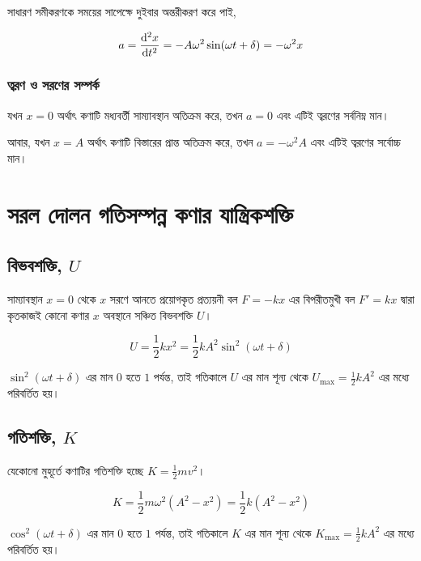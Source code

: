 সাধারণ সমীকরণকে সময়ের সাপেক্ষে দুইবার অন্তরীকরণ করে পাই,

\begin{equation}
    a = \dv[2]{x}{t} = -A\omega^2 \sin(\omega t + \delta) = -\omega^2 x
\end{equation}

\subsubsection{ত্বরণ ও সরণের সম্পর্ক}

যখন $x = 0$ অর্থাৎ কণাটি মধ্যবর্তী সাম্যাবস্থান অতিক্রম করে, তখন $a = 0$ এবং এটিই ত্বরণের সর্বনিম্ন মান।

আবার, যখন $x = A$ অর্থাৎ কণাটি বিস্তারের প্রান্ত অতিক্রম করে, তখন $a = -\omega^2 A$ এবং এটিই ত্বরণের সর্বোচ্চ মান।

\section{সরল দোলন গতিসম্পন্ন কণার যান্ত্রিকশক্তি}

\subsection{বিভবশক্তি, $U$}

সাম্যাবস্থান $x = 0$ থেকে $x$ সরণে আনতে প্রয়োগকৃত প্রত্যয়নী বল $F = -kx$ এর বিপরীতমুখী বল $F' = kx$ দ্বারা কৃতকাজই কোনো কণার $x$ অবস্থানে সঞ্চিত বিভবশক্তি $U$।

\begin{equation}
    U = \frac{1}{2}kx^2 = \frac{1}{2}k A^2 \sin^2(\omega t + \delta)
\end{equation}

$\sin^2(\omega t + \delta)$ এর মান $0$ হতে $1$ পর্যন্ত, তাই গতিকালে $U$ এর মান শূন্য থেকে $U_{\max} = \frac{1}{2}kA^2$ এর মধ্যে পরিবর্তিত হয়।

\subsection{গতিশক্তি, $K$}

যেকোনো মুহূর্তে কণাটির গতিশক্তি হচ্ছে $K = \frac{1}{2}mv^2$।

\begin{equation}
    K = \frac{1}{2}m\omega^2(A^2 - x^2) = \frac{1}{2}k(A^2 - x^2)
\end{equation}

$\cos^2(\omega t + \delta)$ এর মান $0$ হতে $1$ পর্যন্ত, তাই গতিকালে $K$ এর মান শূন্য থেকে $K_{\max} = \frac{1}{2}kA^2$ এর মধ্যে পরিবর্তিত হয়।

